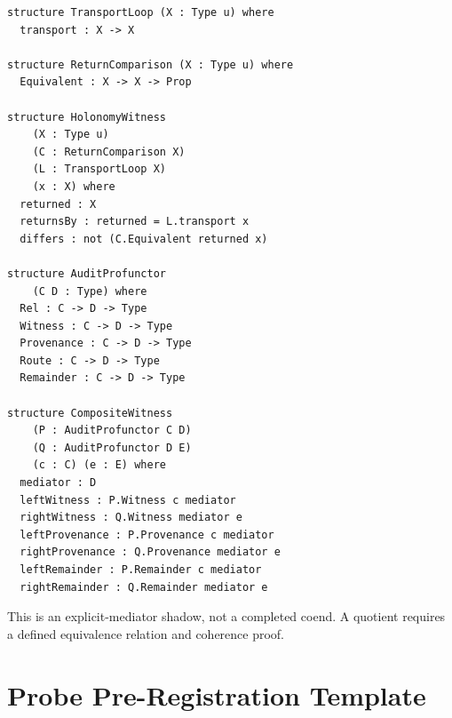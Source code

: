 \documentclass[12pt,openany]{book}
\theoremstyle{remark}
\begin{document}
\begin{verbatim}
structure TransportLoop (X : Type u) where
  transport : X -> X

structure ReturnComparison (X : Type u) where
  Equivalent : X -> X -> Prop

structure HolonomyWitness
    (X : Type u)
    (C : ReturnComparison X)
    (L : TransportLoop X)
    (x : X) where
  returned : X
  returnsBy : returned = L.transport x
  differs : not (C.Equivalent returned x)

structure AuditProfunctor
    (C D : Type) where
  Rel : C -> D -> Type
  Witness : C -> D -> Type
  Provenance : C -> D -> Type
  Route : C -> D -> Type
  Remainder : C -> D -> Type

structure CompositeWitness
    (P : AuditProfunctor C D)
    (Q : AuditProfunctor D E)
    (c : C) (e : E) where
  mediator : D
  leftWitness : P.Witness c mediator
  rightWitness : Q.Witness mediator e
  leftProvenance : P.Provenance c mediator
  rightProvenance : Q.Provenance mediator e
  leftRemainder : P.Remainder c mediator
  rightRemainder : Q.Remainder mediator e
\end{verbatim}

This is an explicit-mediator shadow, not a completed coend. A quotient requires a defined equivalence relation and coherence proof.

\chapter{Probe Pre-Registration Template}
\label{app:prereg-template}
\end{document}
